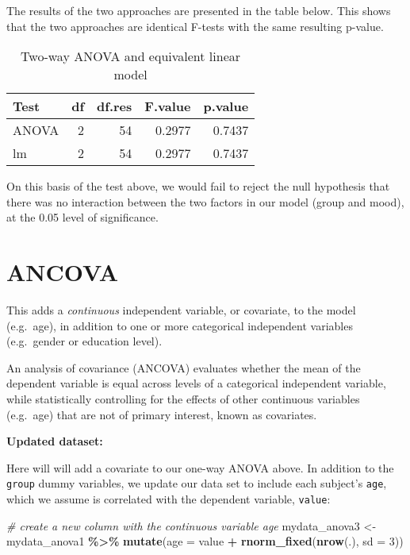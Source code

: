\documentclass[
  12pt,
]{krantz}
\newenvironment{Shaded}{\begin{snugshade}}{\end{snugshade}}
\newcommand{\CommentTok}[1]{\textcolor[rgb]{0.56,0.35,0.01}{\textit{#1}}}
\newcommand{\DataTypeTok}[1]{\textcolor[rgb]{0.13,0.29,0.53}{#1}}
\newcommand{\DecValTok}[1]{\textcolor[rgb]{0.00,0.00,0.81}{#1}}
\newcommand{\KeywordTok}[1]{\textcolor[rgb]{0.13,0.29,0.53}{\textbf{#1}}}
\newcommand{\NormalTok}[1]{#1}
\newcommand{\OperatorTok}[1]{\textcolor[rgb]{0.81,0.36,0.00}{\textbf{#1}}}
\newcommand{\StringTok}[1]{\textcolor[rgb]{0.31,0.60,0.02}{#1}}
\begin{document}
The results of the two approaches are presented in the table below. This shows that the two approaches are identical F-tests with the same resulting p-value.

\begin{table}

\caption{\label{tab:unnamed-chunk-48}Two-way ANOVA and equivalent linear model}
\centering
\begin{tabular}[t]{lrrrr}
\toprule
Test & df & df.res & F.value & p.value\\
\midrule
ANOVA & 2 & 54 & 0.2977 & 0.7437\\
lm & 2 & 54 & 0.2977 & 0.7437\\
\bottomrule
\end{tabular}
\end{table}

On this basis of the test above, we would fail to reject the null hypothesis that there was no interaction between the two factors in our model (group and mood), at the 0.05 level of significance.

\hypertarget{ancova}{%
\section{ANCOVA}\label{ancova}}

This adds a \emph{continuous} independent variable, or covariate, to the model (e.g.~age), in addition to one or more categorical independent variables (e.g.~gender or education level).

An analysis of covariance (ANCOVA) evaluates whether the mean of the dependent variable is equal across levels of a categorical independent variable, while statistically controlling for the effects of other continuous variables (e.g.~age) that are not of primary interest, known as covariates.

\textbf{Updated dataset:}

Here will will add a covariate to our one-way ANOVA above. In addition to the \texttt{group} dummy variables, we update our data set to include each subject's \texttt{age}, which we assume is correlated with the dependent variable, \texttt{value}:

\begin{Shaded}
\begin{Highlighting}[]
\CommentTok{\# create a new column with the continuous variable \textquotesingle{}age\textquotesingle{}}
\NormalTok{mydata\_anova3 \textless{}{-}}\StringTok{ }\NormalTok{mydata\_anova1 }\OperatorTok{\%\textgreater{}\%}
\StringTok{  }\KeywordTok{mutate}\NormalTok{(}\DataTypeTok{age =}\NormalTok{ value }\OperatorTok{+}\StringTok{ }\KeywordTok{rnorm\_fixed}\NormalTok{(}\KeywordTok{nrow}\NormalTok{(.), }\DataTypeTok{sd =} \DecValTok{3}\NormalTok{))}
\end{Highlighting}
\end{Shaded}
\end{document}
